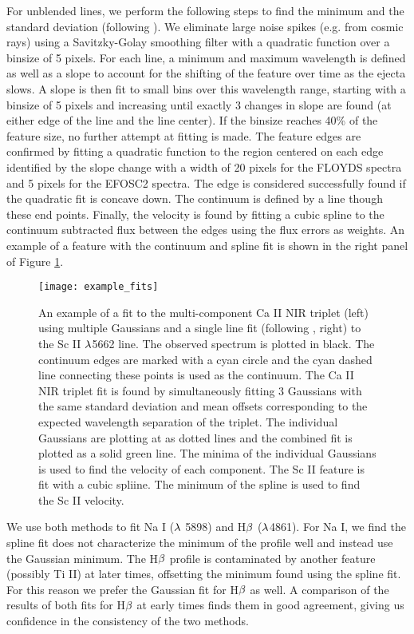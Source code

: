 \documentclass[a4paper,fleqn,usenatbib]{mnras}
\begin{document}
For unblended lines, we perform the following steps to find the minimum and the standard deviation (following \citealt{2012silverman}).
We eliminate large noise spikes (e.g. from cosmic rays) using a Savitzky-Golay smoothing filter \citep{1964savitzky} with a quadratic function over a binsize of 5 pixels. 
For each line, a minimum and maximum wavelength is defined as well as a slope to account for the shifting of the feature over time as the ejecta slows. 
A slope is then fit to small bins over this wavelength range, starting with a binsize of 5 pixels and increasing until exactly 3 changes in slope are found (at either edge of the line and the line center). 
If the binsize reaches 40\% of the feature size, no further attempt at fitting is made. 
The feature edges are confirmed by fitting a quadratic function to the region centered on each edge identified by the slope change with a width of 20 pixels for the FLOYDS spectra and 5 pixels for the EFOSC2 spectra. 
The edge is considered successfully found if the quadratic fit is concave down. 
The continuum is defined by a line though these end points.
Finally, the velocity is found by fitting a cubic spline to the continuum subtracted flux between the edges using the flux errors as weights. 
An example of a feature with the continuum and spline fit is shown in the right panel of Figure \ref{fig:VelocityFit}.
\begin{figure*}
\begin{center}
\texttt{[image: example\_fits]}
\caption{An example of a fit to the multi-component Ca II NIR triplet (left) using multiple Gaussians and a single line fit (following \citealt{2012silverman}, right) to the Sc II $\rm{\lambda}$5662 line.
The observed spectrum is plotted in black.
The continuum edges are marked with a cyan circle and the cyan dashed line connecting these points is used as the continuum. 
The Ca II NIR triplet fit is found by simultaneously fitting 3 Gaussians with the same standard deviation and mean offsets corresponding to the expected wavelength separation of the triplet. 
The individual Gaussians are plotting at as dotted lines and the combined fit is plotted as a solid green line. 
The minima of the individual Gaussians is used to find the velocity of each component.
The Sc II feature is fit with a cubic spliine. 
The minimum of the spline is used to find the Sc II velocity.
\label{fig:VelocityFit}}
\end{center}
\end{figure*}

We use both methods to fit Na I ($\rm{\lambda}$ 5898) and H$\rm{\beta}$ ($\rm{\lambda}$4861). 
For Na I, we find the spline fit does not characterize the minimum of the profile well and instead use the Gaussian minimum. 
The H$\rm{\beta}$ profile is contaminated by another feature (possibly Ti II) at later times, offsetting the minimum found using the spline fit. 
For this reason we prefer the Gaussian fit for H$\rm{\beta}$ as well. 
A comparison of the results of both fits for H$\rm{\beta}$ at early times finds them in good agreement, giving us confidence in the consistency of the two methods.
\bsp	%
\label{lastpage}
\end{document}
